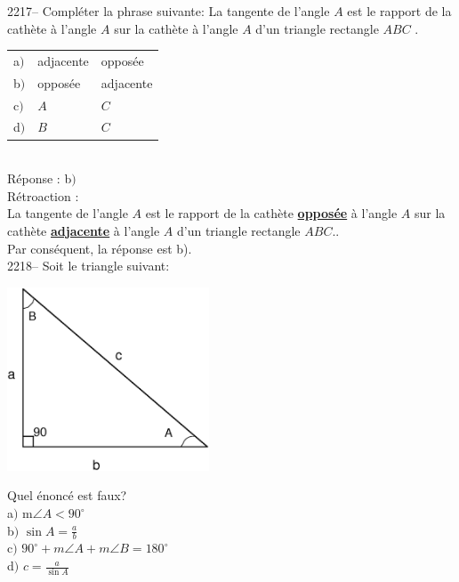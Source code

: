 \documentclass[letterpaper, 12pt]{article}
\begin{document}
2217-- Compl\'eter la phrase suivante: \og La tangente de l'angle $A$ est le rapport de la cath\`ete \underline{\qquad\qquad} \`a l'angle $A$ sur la cath\`ete \underline{\qquad\qquad} \`a l'angle $A$ d'un triangle rectangle $ABC$ \fg. \\

\begin{tabular}{l l l}
 a$)$ & adjacente & oppos\'ee\\
b$)$ & oppos\'ee & adjacente\\
c$)$ & $A$ & $C$ \\
d$)$ & $B$ & $C$\\
\end{tabular}\\

R\'eponse : b$)$\\

R\'etroaction :\\
\og La tangente de l'angle $A$ est le rapport de la cath\`ete \underline{\textbf{oppos\'ee}} \`a l'angle $A$ sur la cath\`ete \underline{\textbf{adjacente}} \`a l'angle $A$ d'un triangle rectangle $ABC$.\fg.\\
Par cons\'equent, la r\'eponse est b).\\

2218-- Soit le triangle suivant:\\
\begin{center}
 \includegraphics[width=6cm,bb=14 14 591 533]{Triangle_rectangle2.eps}
\end{center}
Quel \'enonc\'e est faux?\\

a$)$ m$\angle{A} < 90^{\circ}$ \\[2mm]
b$)$ $\sin{A} = \frac{a}{b}$\\[2mm]
c$)$ $90^{\circ}+m\angle{A}+m\angle{B}=180^{\circ}$\\[2mm]
d$)$ $c = \frac{a}{\sin{A}}$\\
\end{document}

